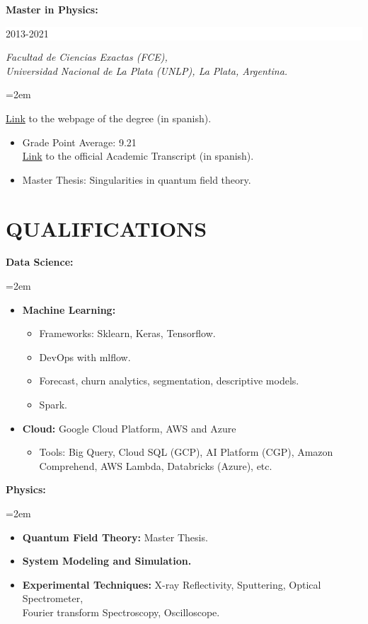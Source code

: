 \documentclass[paper=letter,fontsize=11pt]{scrartcl} %
\newcommand{\sepspace}{\vspace*{1em}}		%
\newcommand{\NewPart}[2]{\section*{\uppercase{#1} \small \normalfont #2}}
\newcommand{\EducationEntry}[4]{
		\noindent \textbf{#1} \hfill      %
		\colorbox{White}{%
			\parbox{6em}{%
			\hfill\color{Black}#2}} \par  %
		\noindent \textit{#3} \par        %
		\noindent\hangindent=2em\hangafter=0 \small #4 %
		\normalsize \par}
\newcommand{\WorkEntry}[5]{
		\noindent \textbf{#1}
        \noindent \small \textit{#2}
        \hfill      %
        \colorbox{White}{%
			\parbox{6em}{%
			\hfill\color{Black}#3}} \par  %
		\noindent \textit{#4} \par        %
		\noindent\hangindent=2em\hangafter=0 \small #5 %
		\normalsize \par}
\begin{document}
\EducationEntry{Master in Physics: } {2013-2021}{Facultad de Ciencias Exactas (FCE), \\ Universidad Nacional de La Plata (UNLP), La Plata, Argentina.}{

{\href{http://www.exactas.unlp.edu.ar/licenciatura_en_fisica}{Link}} to the webpage of the degree (in spanish).
\begin{itemize}
\item{Grade Point Average: 9.21 \\ {\href{https://drive.google.com/drive/folders/1je8C0gsbGixCF5rJo3fzQaqo1cs2mjX7?usp=sharing}{Link}} to the official Academic Transcript (in spanish).}
\item{Master Thesis: Singularities in quantum field theory.}
\end{itemize}

}

\sepspace








\NewPart{QUALIFICATIONS}{}


\sepspace

\WorkEntry{Data Science:}{}{}{}{
\begin{itemize}
\item \textbf{Machine Learning:} 
\begin{itemize}
 \item 	Frameworks: Sklearn, Keras, Tensorflow.
 \item DevOps with mlflow.
 \item Forecast, churn analytics, segmentation, descriptive models.
 \item Spark.
\end{itemize}
\item \textbf{Cloud:} 
Google Cloud Platform, AWS and Azure
\begin{itemize}
  \item  Tools:  Big Query, Cloud SQL (GCP), AI Platform (CGP), Amazon Comprehend, AWS Lambda, Databricks (Azure), etc.
\end{itemize}
\end{itemize}
}


\sepspace

\WorkEntry{Physics:}{}{}{}{
\begin{itemize}
\item \textbf{Quantum Field Theory:} Master Thesis.
\item \textbf{System Modeling and Simulation.}
\item \textbf{Experimental Techniques:} X-ray Reflectivity, Sputtering, Optical Spectrometer, \\ Fourier transform Spectroscopy, Oscilloscope.
\end{itemize}
}
\end{document}
